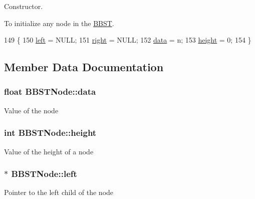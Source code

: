 Constructor. 

To initialize any node in the \hyperlink{class_b_b_s_t}{B\+B\+S\+T}. 
\begin{DoxyCode}
149             \{
150             \hyperlink{class_b_b_s_t_node_a3ddadad752d9107c9e967b993d2666fe}{left} = NULL;
151             \hyperlink{class_b_b_s_t_node_ab8a78bee2fb0aa4e7e6d2feb8be28268}{right} = NULL;
152             \hyperlink{class_b_b_s_t_node_a701ac339cb2b6f633444e4e2be660cb2}{data} = n;
153             \hyperlink{class_b_b_s_t_node_a2347b11f5e1cdd08dc9047f5e16aa481}{height} = 0;
154         \}
\end{DoxyCode}


\subsection{Member Data Documentation}
\hypertarget{class_b_b_s_t_node_a701ac339cb2b6f633444e4e2be660cb2}{}
\subsubsection[{data}]{\setlength{\rightskip}{0pt plus 5cm}float B\+B\+S\+T\+Node\+::data}\label{class_b_b_s_t_node_a701ac339cb2b6f633444e4e2be660cb2}
Value of the node \hypertarget{class_b_b_s_t_node_a2347b11f5e1cdd08dc9047f5e16aa481}{}
\subsubsection[{height}]{\setlength{\rightskip}{0pt plus 5cm}int B\+B\+S\+T\+Node\+::height}\label{class_b_b_s_t_node_a2347b11f5e1cdd08dc9047f5e16aa481}
Value of the height of a node \hypertarget{class_b_b_s_t_node_a3ddadad752d9107c9e967b993d2666fe}{}
\subsubsection[{left}]{$\ast$ B\+B\+S\+T\+Node\+::left}\label{class_b_b_s_t_node_a3ddadad752d9107c9e967b993d2666fe}
Pointer to the left child of the node \hypertarget{class_b_b_s_t_node_ab8a78bee2fb0aa4e7e6d2feb8be28268}{}
